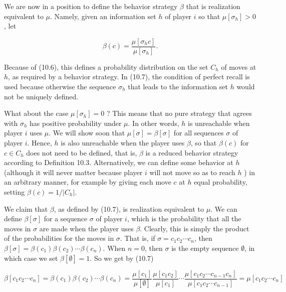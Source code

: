 \documentclass[12pt]{article}
\begin{document}
We are now in a position to define the behavior strategy $\beta$ that is realization equivalent to $\mu$. Namely, given an information set $h$ of player $i$ so that $\mu\left[\sigma_{h}\right]>0$, let


\begin{equation*}
\beta(c)=\frac{\mu\left[\sigma_{h} c\right]}{\mu\left[\sigma_{h}\right]} . \tag{10.7}
\end{equation*}


Because of (10.6), this defines a probability distribution on the set $C_{h}$ of moves at $h$, as required by a behavior strategy. In (10.7), the condition of perfect recall is used because otherwise the sequence $\sigma_{h}$ that leads to the information set $h$ would not be uniquely defined.

What about the case $\mu\left[\sigma_{h}\right]=0$ ? This means that no pure strategy that agrees with $\sigma_{h}$ has positive probability under $\mu$. In other words, $h$ is unreachable when player $i$ uses $\mu$. We will show soon that $\mu[\sigma]=\beta[\sigma]$ for all sequences $\sigma$ of player $i$. Hence, $h$ is also unreachable when the player uses $\beta$, so that $\beta(c)$ for $c \in C_{h}$ does not need to be defined, that is, $\beta$ is a reduced behavior strategy according to Definition 10.3. Alternatively, we can define some behavior at $h$ (although it will never matter because player $i$ will not move so as to reach $h$ ) in an arbitrary manner, for example by giving each move $c$ at $h$ equal probability, setting $\beta(c)=1 /\left|C_{h}\right|$.

We claim that $\beta$, as defined by (10.7), is realization equivalent to $\mu$. We can define $\beta[\sigma]$ for a sequence $\sigma$ of player $i$, which is the probability that all the moves in $\sigma$ are made when the player uses $\beta$. Clearly, this is simply the product of the probabilities for the moves in $\sigma$. That is, if $\sigma=c_{1} c_{2} \cdots c_{n}$, then $\beta[\sigma]=\beta\left(c_{1}\right) \beta\left(c_{2}\right) \cdots \beta\left(c_{n}\right)$. When $n=0$, then $\sigma$ is the empty sequence $\emptyset$, in which case we set $\beta[\emptyset]=1$. So we get by (10.7)

$$
\beta\left[c_{1} c_{2} \cdots c_{n}\right]=\beta\left(c_{1}\right) \beta\left(c_{2}\right) \cdots \beta\left(c_{n}\right)=\frac{\mu\left[c_{1}\right]}{\mu[\emptyset]} \frac{\mu\left[c_{1} c_{2}\right]}{\mu\left[c_{1}\right]} \cdots \frac{\mu\left[c_{1} c_{2} \cdots c_{n-1} c_{n}\right]}{\mu\left[c_{1} c_{2} \cdots c_{n-1}\right]}=\mu\left[c_{1} c_{2} \cdots c_{n}\right]
$$
\end{document}

